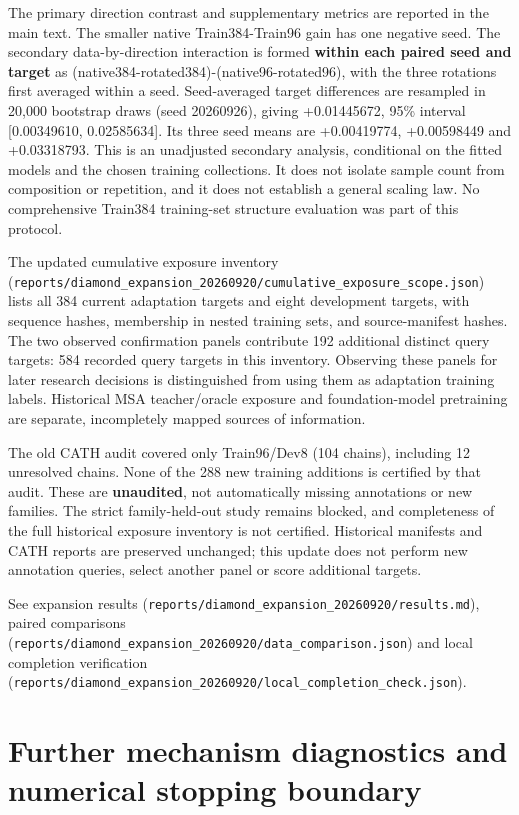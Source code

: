 The primary direction contrast and supplementary metrics are reported in the
main text. The smaller native Train384-Train96 gain has one negative seed.
The secondary data-by-direction interaction is formed \textbf{within each paired
seed and target} as (native384-rotated384)-(native96-rotated96), with the three
rotations first averaged within a seed. Seed-averaged target differences are
resampled in 20,000 bootstrap draws (seed 20260926), giving +0.01445672,
95\% interval {[}0.00349610, 0.02585634{]}. Its three seed means are +0.00419774,
+0.00598449 and +0.03318793. This is an unadjusted secondary analysis,
conditional on the fitted models and the chosen training collections. It does
not isolate sample count from composition or repetition, and it does not
establish a general scaling law. No comprehensive Train384 training-set structure
evaluation was part of this protocol.

The updated cumulative exposure inventory (\nolinkurl{reports/diamond_expansion_20260920/cumulative_exposure_scope.json})
lists all 384 current adaptation targets and eight development targets, with
sequence hashes, membership in nested training sets, and source-manifest hashes.
The two observed confirmation panels contribute 192 additional distinct query
targets: 584 recorded query targets in this inventory. Observing these panels
for later research decisions is distinguished from using them as adaptation
training labels. Historical MSA teacher/oracle exposure and foundation-model
pretraining are separate, incompletely mapped sources of information.

The old CATH audit covered only Train96/Dev8 (104 chains), including 12 unresolved
chains. None of the 288 new training additions is certified by that audit.
These are \textbf{unaudited}, not automatically missing annotations or new families.
The strict family-held-out study remains blocked, and completeness of the full
historical exposure inventory is not certified. Historical manifests and CATH
reports are preserved unchanged; this update does not perform new annotation
queries, select another panel or score additional targets.

See expansion results (\nolinkurl{reports/diamond_expansion_20260920/results.md}),
paired comparisons (\nolinkurl{reports/diamond_expansion_20260920/data_comparison.json})
and local completion verification (\nolinkurl{reports/diamond_expansion_20260920/local_completion_check.json}).

\section{Further mechanism diagnostics and numerical stopping boundary}\label{further-mechanism-diagnostics-and-numerical-stopping-boundary}

